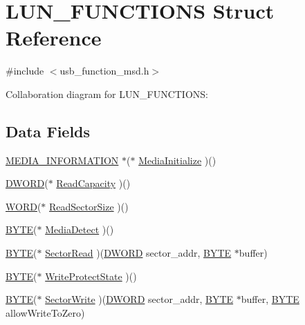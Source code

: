 \hypertarget{struct_l_u_n___f_u_n_c_t_i_o_n_s}{}\section{L\+U\+N\+\_\+\+F\+U\+N\+C\+T\+I\+O\+N\+S Struct Reference}
\label{struct_l_u_n___f_u_n_c_t_i_o_n_s}


{\ttfamily \#include $<$usb\+\_\+function\+\_\+msd.\+h$>$}



Collaboration diagram for L\+U\+N\+\_\+\+F\+U\+N\+C\+T\+I\+O\+N\+S\+:
\subsection*{Data Fields}
\begin{DoxyCompactItemize}
\item 
\hyperlink{struct_m_e_d_i_a___i_n_f_o_r_m_a_t_i_o_n}{M\+E\+D\+I\+A\+\_\+\+I\+N\+F\+O\+R\+M\+A\+T\+I\+O\+N} $\ast$($\ast$ \hyperlink{struct_l_u_n___f_u_n_c_t_i_o_n_s_a8eeff1d023205898ca4b35fe424c7ba7}{Media\+Initialize} )()
\item 
\hyperlink{_generic_type_defs_8h_ad342ac907eb044443153a22f964bf0af}{D\+W\+O\+R\+D}($\ast$ \hyperlink{struct_l_u_n___f_u_n_c_t_i_o_n_s_a4020fcd582133cca4bfee4602d7d3d30}{Read\+Capacity} )()
\item 
\hyperlink{_generic_type_defs_8h_a2b0e863dadf920709ec53d9088ee7c91}{W\+O\+R\+D}($\ast$ \hyperlink{struct_l_u_n___f_u_n_c_t_i_o_n_s_a7573531b62de308a74ab742eaf739741}{Read\+Sector\+Size} )()
\item 
\hyperlink{_generic_type_defs_8h_a4ae1dab0fb4b072a66584546209e7d58}{B\+Y\+T\+E}($\ast$ \hyperlink{struct_l_u_n___f_u_n_c_t_i_o_n_s_adad634edaa8809c1365a69945b7f8502}{Media\+Detect} )()
\item 
\hyperlink{_generic_type_defs_8h_a4ae1dab0fb4b072a66584546209e7d58}{B\+Y\+T\+E}($\ast$ \hyperlink{struct_l_u_n___f_u_n_c_t_i_o_n_s_ae6ada99255fb6b473d160c9f5d0f529b}{Sector\+Read} )(\hyperlink{_generic_type_defs_8h_ad342ac907eb044443153a22f964bf0af}{D\+W\+O\+R\+D} sector\+\_\+addr, \hyperlink{_generic_type_defs_8h_a4ae1dab0fb4b072a66584546209e7d58}{B\+Y\+T\+E} $\ast$buffer)
\item 
\hyperlink{_generic_type_defs_8h_a4ae1dab0fb4b072a66584546209e7d58}{B\+Y\+T\+E}($\ast$ \hyperlink{struct_l_u_n___f_u_n_c_t_i_o_n_s_a49924a3656c6cafef4e0e9ccd398b7c1}{Write\+Protect\+State} )()
\item 
\hyperlink{_generic_type_defs_8h_a4ae1dab0fb4b072a66584546209e7d58}{B\+Y\+T\+E}($\ast$ \hyperlink{struct_l_u_n___f_u_n_c_t_i_o_n_s_a4c7cbb16a7c5d93707b0f47121fca6eb}{Sector\+Write} )(\hyperlink{_generic_type_defs_8h_ad342ac907eb044443153a22f964bf0af}{D\+W\+O\+R\+D} sector\+\_\+addr, \hyperlink{_generic_type_defs_8h_a4ae1dab0fb4b072a66584546209e7d58}{B\+Y\+T\+E} $\ast$buffer, \hyperlink{_generic_type_defs_8h_a4ae1dab0fb4b072a66584546209e7d58}{B\+Y\+T\+E} allow\+Write\+To\+Zero)
\end{DoxyCompactItemize}


